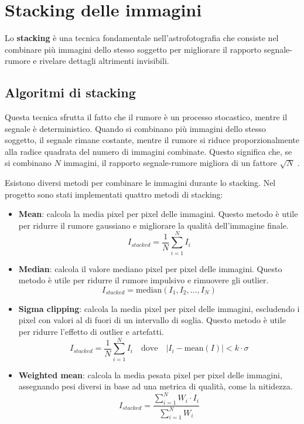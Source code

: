 \section{Stacking delle immagini} \label{sec:stacking}

Lo \textbf{stacking} è una tecnica fondamentale nell'astrofotografia che consiste nel combinare più immagini dello stesso soggetto per migliorare il rapporto segnale-rumore e rivelare dettagli altrimenti invisibili.

\subsection{Algoritmi di stacking} \label{subsec:stacking}

Questa tecnica sfrutta il fatto che il rumore è un processo stocastico, mentre il segnale è deterministico. Quando si combinano più immagini dello stesso soggetto, il segnale rimane costante, mentre il rumore si riduce proporzionalmente alla radice quadrata del numero di immagini combinate. Questo significa che, se si combinano $N$ immagini, il rapporto segnale-rumore migliora di un fattore $\sqrt{N}$ \cite{stacking}.

Esistono diversi metodi per combinare le immagini durante lo stacking. Nel progetto sono stati implementati quattro metodi di stacking:

\begin{itemize}
    \item \textbf{Mean}: calcola la media pixel per pixel delle immagini. Questo metodo è utile per ridurre il rumore gaussiano e migliorare la qualità dell'immagine finale.
    $$
    I_{stacked} = \dfrac{1}{N} \sum_{i=1}^{N} I_i
    $$
    \item \textbf{Median}: calcola il valore mediano pixel per pixel delle immagini. Questo metodo è utile per ridurre il rumore impulsivo e rimuovere gli outlier.
    $$
    I_{stacked} = \text{median}(I_1, I_2, \ldots, I_N)
    $$
    \item \textbf{Sigma clipping}: calcola la media pixel per pixel delle immagini, escludendo i pixel con valori al di fuori di un intervallo di soglia. Questo metodo è utile per ridurre l'effetto di outlier e artefatti.
    $$
    I_{stacked} = \dfrac{1}{N} \sum_{i=1}^{N} I_i \quad \text{dove} \quad |I_i - \text{mean}(I)| < k \cdot \sigma
    $$
    \item \textbf{Weighted mean}: calcola la media pesata pixel per pixel delle immagini, assegnando pesi diversi in base ad una metrica di qualità, come la nitidezza.
    $$
    I_{stacked} = \dfrac{\sum_{i=1}^{N} W_i \cdot I_i}{\sum_{i=1}^{N} W_i}
    $$
\end{itemize}

